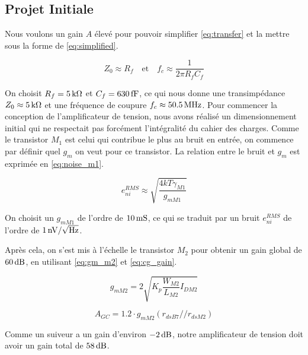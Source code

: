 \documentclass[a4paper,12pt]{article}
\numberwithin{equation}{section}
\newcommand{\?}{\stackrel{?}{=}}
\newcommand{\sis}[2]{\complexnum{#1}\,\si[per-mode=symbol]{#2}}
\begin{document}
\FloatBarrier

\subsection{Projet Initiale}

Nous voulons un gain $A$ élevé pour pouvoir simplifier \eqref{eq:transfer} et la mettre sous la forme de \eqref{eq:simplified}.

\begin{equation}\label{eq:simplified}
    Z_{0}\approx R_f
    \quad
    \text{et}
    \quad
    f_c\approx\frac{1}{2\pi R_fC_f}
\end{equation}

On choisit $R_f=\sis{5}{\kilo\ohm}$ et $C_f=\sis{630}{\femto\farad}$, ce qui nous donne une transimpédance $Z_0\approx\sis{5}{\kilo\ohm}$ et une fréquence de coupure $f_c\approx\sis{50.5}{\mega\hertz}$. Pour commencer la conception de l'amplificateur de tension, nous avons réalisé un dimensionnement initial qui ne respectait pas forcément l'intégralité du cahier des charges. Comme le transistor $M_1$ est celui qui contribue le plus au bruit en entrée, on commence par définir quel $g_m$ on veut pour ce transistor. La relation entre le bruit et $g_m$ est exprimée en \eqref{eq:noise_m1}.

\begin{equation}\label{eq:noise_m1}
    e_{ni}^{RMS}\approx\sqrt{\frac{4kT\gamma_{M1}}{g_{mM1}}}
\end{equation}

On choisit un $g_{mM1}$ de l'ordre de $\sis{10}{\milli\siemens}$, ce qui se traduit par un bruit $e_{ni}^{RMS}$ de l'ordre de $\sis{1}{\nano\volt\per\sqrt{\hertz}}$.

Après cela, on s'est mis à l'échelle le transistor $M_2$ pour obtenir un gain global de $\sis{60}{\decibel}$, en utilisant \eqref{eq:gm_m2} et \eqref{eq:cg_gain}.

\begin{equation}\label{eq:gm_m2}
    g_{mM2}=2\sqrt{K_p\frac{W_{M2}}{L_{M2}}I_{DM2}}
\end{equation}

\begin{equation}\label{eq:cg_gain}
    A_{GC}=\num{1.2}\cdot g_{mM2}\left(r_{dsB7}//r_{dsM2}\right)
\end{equation}

Comme un suiveur a un gain d'environ $\sis{-2}{\decibel}$, notre amplificateur de tension doit avoir un gain total de $\sis{58}{\decibel}$.
\end{document}
